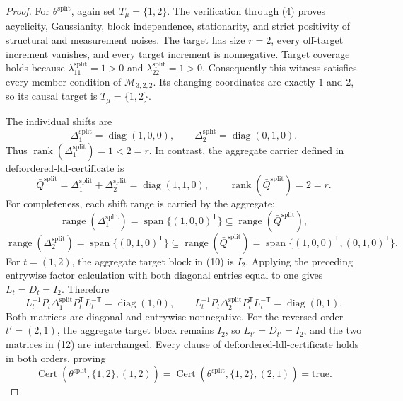 \documentclass{article}
\begin{document}
\begin{proof}
For \(\theta^{\mathrm{split}}\), again set \(T_\mu=\{1,2\}\).  The verification through (4) proves acyclicity, Gaussianity, block independence, stationarity, and strict positivity of structural and measurement noises.  The target has size \(r=2\), every off-target increment vanishes, and every target increment is nonnegative.  Target coverage holds because \(\lambda^{\mathrm{split}}_{11}=1>0\) and \(\lambda^{\mathrm{split}}_{22}=1>0\).  Consequently this witness satisfies every member condition of \(\mathcal M_{3,2,2}\).  Its changing coordinates are exactly \(1\) and \(2\), so its causal target is \(T_\mu=\{1,2\}\).

The individual shifts are
\[
 \Delta^{\mathrm{split}}_1=\operatorname{diag}(1,0,0),\qquad
 \Delta^{\mathrm{split}}_2=\operatorname{diag}(0,1,0). \tag{9}
\]
Thus \(\operatorname{rank}(\Delta^{\mathrm{split}}_1)=1<2=r\).  In contrast, the aggregate carrier defined in \(\text{def:ordered-ldl-certificate}\) is
\[
 \bar Q^{\mathrm{split}}
 =\Delta^{\mathrm{split}}_1+\Delta^{\mathrm{split}}_2
 =\operatorname{diag}(1,1,0),\qquad
 \operatorname{rank}(\bar Q^{\mathrm{split}})=2=r. \tag{10}
\]
For completeness, each shift range is carried by the aggregate:
\[
 \operatorname{range}(\Delta^{\mathrm{split}}_1)
 =\operatorname{span}\{(1,0,0)^{\mathsf T}\}
 \subseteq\operatorname{range}(\bar Q^{\mathrm{split}}),
\]
\[
 \operatorname{range}(\Delta^{\mathrm{split}}_2)
 =\operatorname{span}\{(0,1,0)^{\mathsf T}\}
 \subseteq\operatorname{range}(\bar Q^{\mathrm{split}})
 =\operatorname{span}\{(1,0,0)^{\mathsf T},(0,1,0)^{\mathsf T}\}. \tag{11}
\]
For \(t=(1,2)\), the aggregate target block in (10) is \(I_2\).  Applying the preceding entrywise factor calculation with both diagonal entries equal to one gives \(L_t=D_t=I_2\).  Therefore
\[
 L_t^{-1}P_t\Delta^{\mathrm{split}}_1P_t^{\mathsf T}L_t^{-\mathsf T}
 =\operatorname{diag}(1,0),\qquad
 L_t^{-1}P_t\Delta^{\mathrm{split}}_2P_t^{\mathsf T}L_t^{-\mathsf T}
 =\operatorname{diag}(0,1). \tag{12}
\]
Both matrices are diagonal and entrywise nonnegative.  For the reversed order \(t'=(2,1)\), the aggregate target block remains \(I_2\), so \(L_{t'}=D_{t'}=I_2\), and the two matrices in (12) are interchanged.  Every clause of \(\text{def:ordered-ldl-certificate}\) holds in both orders, proving
\[
 \operatorname{Cert}(\theta^{\mathrm{split}},\{1,2\},(1,2))
 =\operatorname{Cert}(\theta^{\mathrm{split}},\{1,2\},(2,1))
 =\mathrm{true}. \tag{13}
\]


\end{proof}
\end{document}
